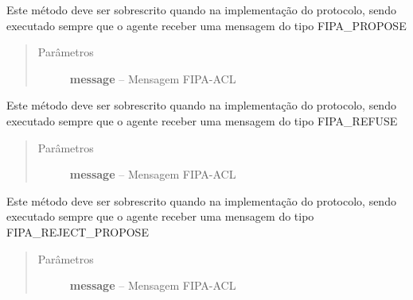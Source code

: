 \documentclass[letterpaper,10pt,brazil]{sphinxmanual}
\begin{document}
\begin{fulllineitems}
\begin{fulllineitems}
\begin{quote}
\begin{description}
\end{description}\end{quote}

\end{fulllineitems}


\begin{fulllineitems}
\label{api:pade.behaviours.protocols.FipaContractNetProtocol.handle_propose}
Este método deve ser sobrescrito quando na implementação
do protocolo, sendo executado sempre que o agente receber
uma mensagem do tipo FIPA\_PROPOSE
\begin{quote}\begin{description}
\item[{Parâmetros}] \leavevmode
\textbf{message} -- Mensagem FIPA-ACL

\end{description}\end{quote}

\end{fulllineitems}


\begin{fulllineitems}
\label{api:pade.behaviours.protocols.FipaContractNetProtocol.handle_refuse}
Este método deve ser sobrescrito quando na implementação
do protocolo, sendo executado sempre que o agente receber
uma mensagem do tipo FIPA\_REFUSE
\begin{quote}\begin{description}
\item[{Parâmetros}] \leavevmode
\textbf{message} -- Mensagem FIPA-ACL

\end{description}\end{quote}

\end{fulllineitems}


\begin{fulllineitems}
\label{api:pade.behaviours.protocols.FipaContractNetProtocol.handle_reject_propose}
Este método deve ser sobrescrito quando na implementação
do protocolo, sendo executado sempre que o agente receber
uma mensagem do tipo FIPA\_REJECT\_PROPOSE
\begin{quote}\begin{description}
\item[{Parâmetros}] \leavevmode
\textbf{message} -- Mensagem FIPA-ACL


\end{description}
\end{quote}
\end{fulllineitems}
\end{fulllineitems}
\end{document}
